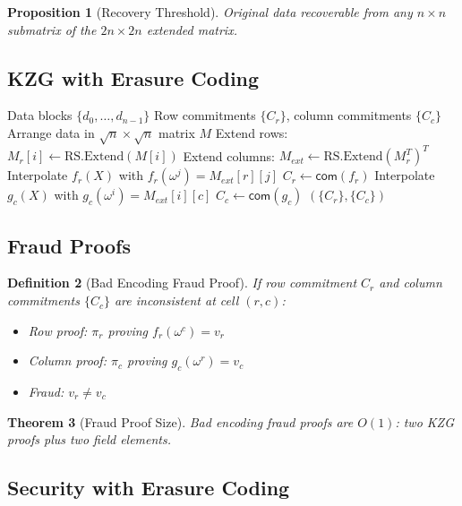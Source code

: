 \documentclass[11pt,a4paper]{article}
\newtheorem{theorem}{Theorem}[section]
\newtheorem{definition}[theorem]{Definition}
\newtheorem{proposition}[theorem]{Proposition}
\newcommand{\com}{\mathsf{com}}
\begin{document}
\begin{proposition}[Recovery Threshold]
Original data recoverable from any $n \times n$ submatrix of the $2n \times 2n$ extended matrix.
\end{proposition}

\subsection{KZG with Erasure Coding}

\begin{algorithm}
\caption{Extended Data Commitment}
\label{alg:extended-commit}
\begin{algorithmic}[1]
\Require Data blocks $\{d_0, \ldots, d_{n-1}\}$
\Ensure Row commitments $\{C_r\}$, column commitments $\{C_c\}$
\State Arrange data in $\sqrt{n} \times \sqrt{n}$ matrix $M$
\State Extend rows: $M_r[i] \gets \text{RS.Extend}(M[i])$
\State Extend columns: $M_{ext} \gets \text{RS.Extend}(M_r^T)^T$
    \State Interpolate $f_r(X)$ with $f_r(\omega^j) = M_{ext}[r][j]$
    \State $C_r \gets \com(f_r)$
\EndFor
{}
    \State Interpolate $g_c(X)$ with $g_c(\omega^i) = M_{ext}[i][c]$
    \State $C_c \gets \com(g_c)$
\EndFor
\State \Return $(\{C_r\}, \{C_c\})$
\end{algorithmic}
\end{algorithm}

\subsection{Fraud Proofs}

\begin{definition}[Bad Encoding Fraud Proof]
If row commitment $C_r$ and column commitments $\{C_c\}$ are inconsistent at cell $(r, c)$:
\begin{itemize}
    \item Row proof: $\pi_r$ proving $f_r(\omega^c) = v_r$
    \item Column proof: $\pi_c$ proving $g_c(\omega^r) = v_c$
    \item Fraud: $v_r \neq v_c$
\end{itemize}
\end{definition}

\begin{theorem}[Fraud Proof Size]
Bad encoding fraud proofs are $O(1)$: two KZG proofs plus two field elements.
\end{theorem}

\subsection{Security with Erasure Coding}
\end{document}
